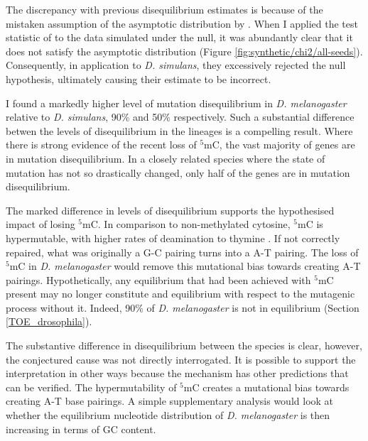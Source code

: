 The discrepancy with previous disequilibrium estimates is because of the mistaken assumption of the asymptotic distribution by \cite{Squartini2008QuantifyingProcess}. When I applied the test statistic of \cite{Squartini2008QuantifyingProcess} to the data simulated under the null, it was abundantly clear that it does not satisfy the asymptotic distribution (Figure \ref{fig:synthetic/chi2/all-seeds}). Consequently, in application to \textit{D. simulans}, they excessively rejected the null hypothesis, ultimately causing their estimate to be incorrect.

I found a markedly higher level of mutation disequilibrium in \textit{D. melanogaster} relative to \textit{D. simulans}, 90\% and 50\% respectively. Such a substantial difference betwen the levels of disequilibrium in the lineages is a compelling result. Where there is strong evidence of the recent loss of $^5$mC, the vast majority of genes are in mutation disequilibrium. In a closely related species where the state of mutation has not so drastically changed, only half of the genes are in mutation disequilibrium.

The marked difference in levels of disequilibrium supports the hypothesised impact of losing $^5$mC. In comparison to non-methylated cytosine, $^5$mC is hypermutable, with higher rates of deamination to thymine \citep{Shen1994TheDNA, Coulondre1978MolecularColi}. If not correctly repaired, what was originally a G-C pairing turns into a A-T pairing. The loss of $^5$mC in \textit{D. melanogaster} would remove this mutational bias towards creating A-T pairings. Hypothetically, any equilibrium that had been achieved with $^5$mC present may no longer constitute and equilibrium with respect to the mutagenic process without it. Indeed, 90\% of \textit{D. melanogaster} is not in equilibrium (Section \ref{TOE_drosophila}). 

The substantive difference in disequilibrium between the species is clear, however, the conjectured cause was not directly interrogated. It is possible to support the interpretation in other ways because the mechanism has other predictions that can be verified. The hypermutability of $^5$mC creates a mutational bias towards creating A-T base pairings. A simple supplementary analysis would look at whether the equilibrium nucleotide distribution of \textit{D. melanogaster} is then increasing in terms of GC content. 

